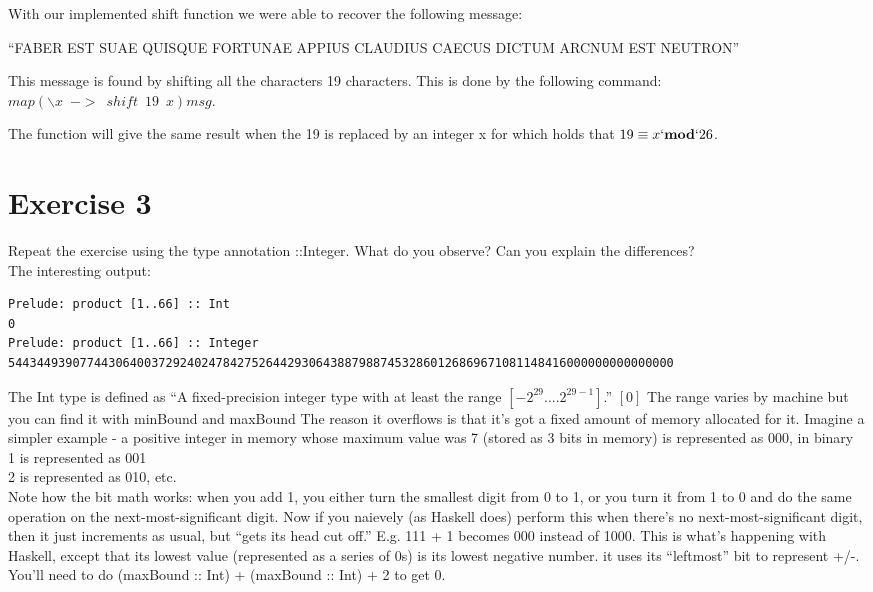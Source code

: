 \documentclass{article}
\begin{document}
With our implemented shift function we were able to recover the following message:

``FABER EST SUAE QUISQUE FORTUNAE APPIUS CLAUDIUS CAECUS DICTUM ARCNUM EST NEUTRON''

This message is found by shifting all the characters 19 characters. This is done by the following command:
$map (\backslash x \enspace -> \enspace shift \enspace 19 \enspace x)msg$.

The function will give the same result when the 19 is replaced by an integer x for which holds that $19 \equiv x `\textbf{mod}` 26$.

\newpage
\section*{Exercise 3}
Repeat the exercise using the type annotation ::Integer. What do you observe? Can you explain the differences?\\
\newline
The interesting output:
\begin{lstlisting}
Prelude: product [1..66] :: Int
0
Prelude: product [1..66] :: Integer
544344939077443064003729240247842752644293064388798874532860126869671081148416000000000000000
\end{lstlisting}
The Int type is defined as ``A fixed-precision integer type with at least the range $[-2^{29} \dots. 2^{29-1}]$.'' $[0]$ The range varies by machine but you can find it with minBound and maxBound
\newline
The reason it overflows is that it's got a fixed amount of memory allocated for it. Imagine a simpler example - a positive integer in memory whose maximum value was 7 (stored as 3 bits in memory)
\newline
{} is represented as 000, in binary\\
1 is represented as 001\\
2 is represented as 010, etc.\\
\newline
Note how the bit math works: when you add 1, you either turn the smallest digit from 0 to 1, or you turn it from 1 to 0 and do the same operation on the next-most-significant digit.
\newline
\newline
Now if you naievely (as Haskell does) perform this when there's no next-most-significant digit, then it just increments as usual, but ``gets its head cut off.'' E.g. 111 + 1 becomes 000 instead of 1000. This is what's happening with Haskell, except that its lowest value (represented as a series of 0s) is its lowest negative number. it uses its ``leftmost'' bit to represent +/-. You'll need to do (maxBound :: Int) + (maxBound :: Int) + 2 to get 0.
\end{document}
